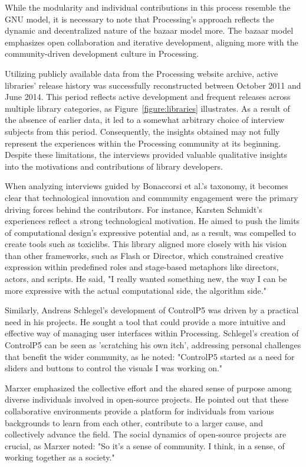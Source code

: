 While the modularity and individual contributions in this process resemble the GNU model, it is necessary to note that Processing's approach reflects the dynamic and decentralized nature of the bazaar model more. The bazaar model emphasizes open collaboration and iterative development, aligning more with the community-driven development culture in Processing.

Utilizing publicly available data from the Processing website archive, active libraries' release history was successfully reconstructed between October 2011 and June 2014. This period reflects active development and frequent releases across multiple library categories, as Figure~\ref*{figure:libraries} illustrates. As a result of the absence of earlier data, it led to a somewhat arbitrary choice of interview subjects from this period. Consequently, the insights obtained may not fully represent the experiences within the Processing community at its beginning. Despite these limitations, the interviews provided valuable qualitative insights into the motivations and contributions of library developers. 



When analyzing interviews guided by Bonaccorsi et al.'s taxonomy, it becomes clear that technological innovation and community engagement were the primary driving forces behind the contributors. For instance, Karsten Schmidt's experiences reflect a strong technological motivation. He aimed to push the limits of computational design's expressive potential and, as a result, was compelled to create tools such as toxiclibs. This library aligned more closely with his vision than other frameworks, such as Flash or Director, which constrained creative expression within predefined roles and stage-based metaphors like directors, actors, and scripts. He said, "I really wanted something new, the way I can be more expressive with the actual computational side, the algorithm side."

Similarly, Andreas Schlegel's development of ControlP5 was driven by a practical need in his projects. He sought a tool that could provide a more intuitive and effective way of managing user interfaces within Processing. Schlegel's creation of ControlP5 can be seen as 'scratching his own itch', addressing personal challenges that benefit the wider community, as he noted: "ControlP5 started as a need for sliders and buttons to control the visuals I was working on."

Marxer emphasized the collective effort and the shared sense of purpose among diverse individuals involved in open-source projects. He pointed out that these collaborative environments provide a platform for individuals from various backgrounds to learn from each other, contribute to a larger cause, and collectively advance the field. The social dynamics of open-source projects are crucial, as Marxer noted: "So it's a sense of community. I think, in a sense, of working together as a society."

